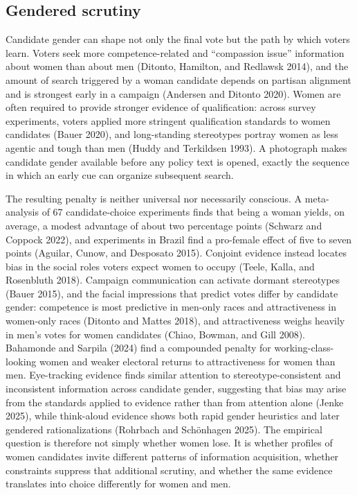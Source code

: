 \documentclass[11pt]{article}\usepackage[]{graphicx}\usepackage[]{xcolor}
\begin{document}
\subsection{Gendered scrutiny}

Candidate gender can shape not only the final vote but the path by which voters learn. Voters seek more competence-related and ``compassion issue'' information about women than about men (Ditonto, Hamilton, and Redlawsk 2014), and the amount of search triggered by a woman candidate depends on partisan alignment and is strongest early in a campaign (Andersen and Ditonto 2020). Women are often required to provide stronger evidence of qualification: across survey experiments, voters applied more stringent qualification standards to women candidates (Bauer 2020), and long-standing stereotypes portray women as less agentic and tough than men (Huddy and Terkildsen 1993). A photograph makes candidate gender available before any policy text is opened, exactly the sequence in which an early cue can organize subsequent search.

The resulting penalty is neither universal nor necessarily conscious. A meta-analysis of 67 candidate-choice experiments finds that being a woman yields, on average, a modest advantage of about two percentage points (Schwarz and Coppock 2022), and experiments in Brazil find a pro-female effect of five to seven points (Aguilar, Cunow, and Desposato 2015). Conjoint evidence instead locates bias in the social roles voters expect women to occupy (Teele, Kalla, and Rosenbluth 2018). Campaign communication can activate dormant stereotypes (Bauer 2015), and the facial impressions that predict votes differ by candidate gender: competence is most predictive in men-only races and attractiveness in women-only races (Ditonto and Mattes 2018), and attractiveness weighs heavily in men's votes for women candidates (Chiao, Bowman, and Gill 2008). Bahamonde and Sarpila (2024) find a compounded penalty for working-class-looking women and weaker electoral returns to attractiveness for women than men. Eye-tracking evidence finds similar attention to stereotype-consistent and inconsistent information across candidate gender, suggesting that bias may arise from the standards applied to evidence rather than from attention alone (Jenke 2025), while think-aloud evidence shows both rapid gender heuristics and later gendered rationalizations (Rohrbach and Sch\"onhagen 2025). The empirical question is therefore not simply whether women lose. It is whether profiles of women candidates invite different patterns of information acquisition, whether constraints suppress that additional scrutiny, and whether the same evidence translates into choice differently for women and men.
\end{document}
